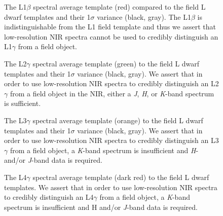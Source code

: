 \documentclass[12pt,preprint]{aastex}
\begin{document}
\begin{figure}
	\caption{The L1$\beta$ spectral average template (red) compared to the field L dwarf templates and their 1$\sigma$ variance (black, gray). The L1$\beta$ is indistinguishable from the L1 field template and thus we assert that low-resolution NIR spectra cannot be used to credibly distinguish an L1$\gamma$ from a field object.}
	\label{fig:L1b-field}
\end{figure}

\begin{figure}
	\caption{The L2$\gamma$ spectral average template (green) to the field L dwarf templates and their 1$\sigma$ variance (black, gray).
	We assert that in order to use low-resolution NIR spectra to credibly distinguish an L2$\gamma$ from a field object in the NIR, either a \emph{J}, \emph{H}, or \emph{K}-band spectrum is sufficient.}
	\label{fig:L2lg-field}
\end{figure}

\begin{figure}
	\caption{The L3$\gamma$ spectral average template (orange) to the field L dwarf templates and their 1$\sigma$ variance (black, gray).
	We assert that in order to use low-resolution NIR spectra to credibly distinguish an L3$\gamma$ from a field object, a \emph{K}-band spectrum is insufficient and \emph{H}- and/or \emph{J}-band data is required.}
	\label{fig:L3lg-field}
\end{figure}

\begin{figure}
	\caption{The L4$\gamma$ spectral average template (dark red) to the field L dwarf templates. 
	We assert that in order to use low-resolution NIR spectra to credibly distinguish an L4$\gamma$ from a field object, a \emph{K}-band spectrum is insufficient and H and/or \emph{J}-band data is required.}
	\label{fig:L4lg-field}
\end{figure}


\end{document}
